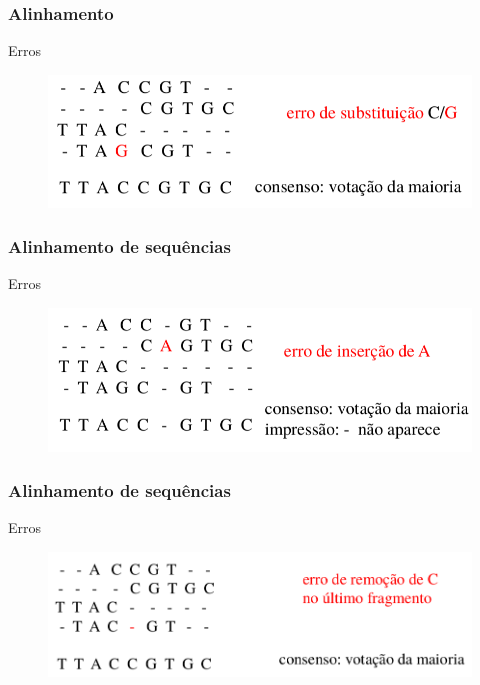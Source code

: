 \documentclass{beamer}
\begin{document}
	\begin{frame}\frametitle{Alinhamento}
	\begin{block}{Erros}
		\begin{figure}[hbtp]
			\centering
			\includegraphics[scale=0.4]{img/erroSubstituicao.png}
		\end{figure}
	\end{block}
	\end{frame}
	\begin{frame}\frametitle{Alinhamento de sequências}
	\begin{block}{Erros}
	\begin{figure}[hbtp]
		\centering
		\includegraphics[scale=0.4]{img/erroInsercao.png}
	\end{figure}
	\end{block}
	\end{frame}
	\begin{frame}\frametitle{Alinhamento de sequências}
	\begin{block}{Erros}
	\begin{figure}[hbtp]
	\centering
	\includegraphics[scale=0.37]{img/erroRemocao.png}
	\end{figure}
	\end{block}
	\end{frame}
\end{document}
